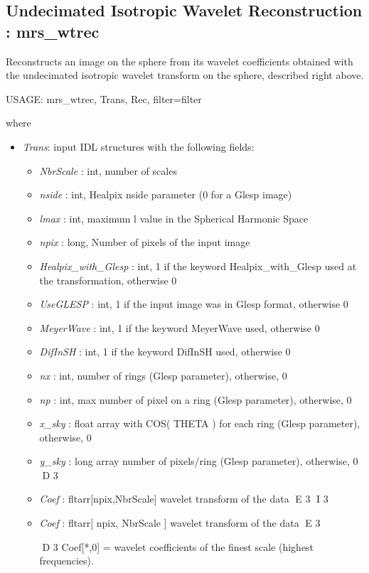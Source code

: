 \subsection{Undecimated Isotropic Wavelet Reconstruction : mrs\_wtrec}
Reconstructs an image on the sphere from its wavelet coefficients obtained with the undecimated isotropic wavelet transform on the sphere, described right above.
{\bf
\begin{center}
     USAGE: mrs\_wtrec, Trans, Rec, filter=filter 
\end{center}}
where 
\begin{itemize}
\item {\em Trans}: input IDL structures with the following fields:  
\begin{itemize}
\item {\em NbrScale} : int, number of scales 
\item {\em nside} : int, Healpix nside parameter (0 for a Glesp image)
\item {\em lmax} : int, maximum l value in the Spherical Harmonic Space
\item {\em npix} : long, Number of pixels of the input image
\item {\em Healpix\_with\_Glesp} : int, 1 if the keyword Healpix\_with\_Glesp used at the transformation, otherwise 0
\item {\em UseGLESP} : int, 1 if the input image was in Glesp format, otherwise 0
\item {\em MeyerWave} : int, 1 if the keyword MeyerWave used, otherwise 0
\item {\em DifInSH} : int, 1 if the keyword DifInSH used, otherwise 0
\item {\em nx} : int, number of rings (Glesp parameter), otherwise, 0
\item {\em np} : int, max number of pixel on a ring (Glesp parameter), otherwise, 0
\item {\em x\_sky} : float array with COS( THETA ) for each ring (Glesp parameter), otherwise, 0
\item {\em y\_sky} : long array number of pixels/ring (Glesp parameter), otherwise, 0
D 3
\item {\em Coef} : fltarr[npix,NbrScale] wavelet transform of the data
E 3
I 3
\item {\em Coef} : fltarr[ npix, NbrScale ] wavelet transform of the data
E 3
\begin{center}
D 3
Coef[*,0] = wavelet coefficients of the finest scale (highest frequencies).\\

\end{center}
\end{itemize}
\end{itemize}
